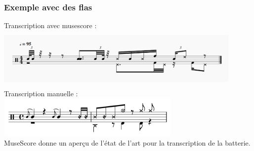 \subsubsection{Exemple avec des flas}
Transcription avec musescore :\\
\includegraphics[height=30mm, width=120mm]{z_images/4_experimentations/1_analyse_midi_audio/2_transcriptions_flas/0_124_funk_95_fill_4-4.png}\\
Transcription manuelle :\\
\includegraphics[height=20mm, width=90mm]{z_images/4_experimentations/1_analyse_midi_audio/2_transcriptions_flas/1_124_funk_95_fill_4-4.png}\\
MuseScore donne un aperçu de l’état de l’art pour la transcription de la batterie.
\newpage
